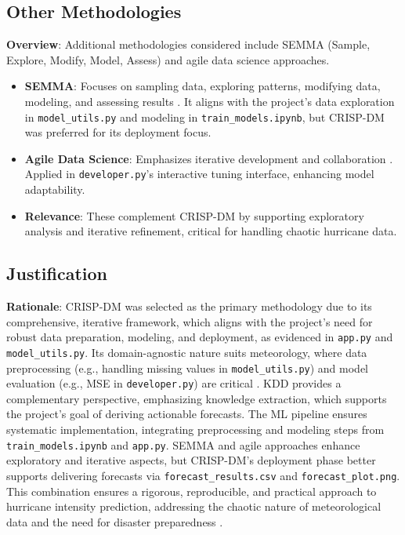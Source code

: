 \subsection{Other Methodologies}
\textbf{Overview}: Additional methodologies considered include SEMMA (Sample, Explore, Modify, Model, Assess) and agile data science approaches.
\begin{itemize}
	\item \textbf{SEMMA}: Focuses on sampling data, exploring patterns, modifying data, modeling, and assessing results \cite{SAS2023}. It aligns with the project's data exploration in \texttt{model\_utils.py} and modeling in \texttt{train\_models.ipynb}, but CRISP-DM was preferred for its deployment focus.
	\item \textbf{Agile Data Science}: Emphasizes iterative development and collaboration \cite{RussellJurney2017}. Applied in \texttt{developer.py}'s interactive tuning interface, enhancing model adaptability.
	\item \textbf{Relevance}: These complement CRISP-DM by supporting exploratory analysis and iterative refinement, critical for handling chaotic hurricane data.
\end{itemize}

\subsection{Justification}
\textbf{Rationale}: CRISP-DM was selected as the primary methodology due to its comprehensive, iterative framework, which aligns with the project's need for robust data preparation, modeling, and deployment, as evidenced in \texttt{app.py} and \texttt{model\_utils.py}. Its domain-agnostic nature suits meteorology, where data preprocessing (e.g., handling missing values in \texttt{model\_utils.py}) and model evaluation (e.g., MSE in \texttt{developer.py}) are critical \cite{WirthBramer2000}. KDD provides a complementary perspective, emphasizing knowledge extraction, which supports the project's goal of deriving actionable forecasts. The ML pipeline ensures systematic implementation, integrating preprocessing and modeling steps from \texttt{train\_models.ipynb} and \texttt{app.py}. SEMMA and agile approaches enhance exploratory and iterative aspects, but CRISP-DM's deployment phase better supports delivering forecasts via \texttt{forecast\_results.csv} and \texttt{forecast\_plot.png}. This combination ensures a rigorous, reproducible, and practical approach to hurricane intensity prediction, addressing the chaotic nature of meteorological data and the need for disaster preparedness \cite{Emanuel2005}.